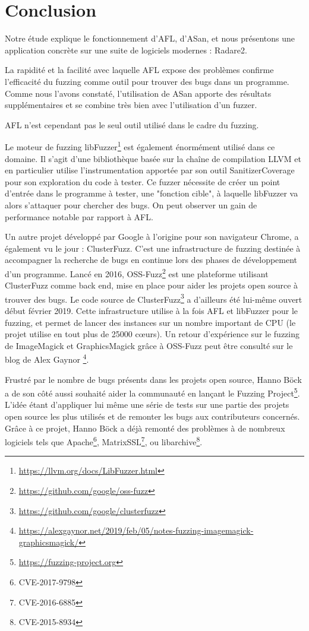 \chapter*{Conclusion}

Notre étude explique le fonctionnement d'AFL, d'ASan, et nous présentons une
application concrète sur une suite de logiciels modernes : Radare2.

La rapidité et la facilité avec laquelle AFL expose des problèmes confirme
l'efficacité du fuzzing comme outil pour trouver des bugs dans un programme.
Comme nous l'avons constaté, l'utilisation de ASan apporte des résultats
supplémentaires et se combine très bien avec l'utilisation d'un fuzzer.

AFL n'est cependant pas le seul outil utilisé dans le cadre du fuzzing.

Le moteur de fuzzing libFuzzer\footnote{\url{https://llvm.org/docs/LibFuzzer.html}}
est également énormément utilisé dans ce domaine.
Il s'agit d'une bibliothèque basée sur la chaîne de compilation LLVM et en
particulier utilise l'instrumentation apportée par son outil SanitizerCoverage
pour son exploration du code à tester.
Ce fuzzer nécessite de créer un point d'entrée dans le programme à tester, une
"fonction cible", à laquelle libFuzzer va alors s'attaquer pour chercher des bugs.
On peut observer un gain de performance notable par rapport à AFL.

Un autre projet développé par Google à l'origine pour son navigateur Chrome,
a également vu le jour : ClusterFuzz.
C'est une infrastructure de fuzzing destinée à accompagner la recherche de
bugs en continue lors des phases de développement d'un programme.
Lancé en 2016, OSS-Fuzz\footnote{\url{https://github.com/google/oss-fuzz}}
est une plateforme utilisant ClusterFuzz comme back end, mise en place pour
aider les projets open source à trouver des bugs. Le code source de
ClusterFuzz\footnote{\url{https://github.com/google/clusterfuzz}}
a d'ailleurs été lui-même ouvert début février 2019.
Cette infrastructure utilise à la fois AFL et libFuzzer pour le fuzzing,
et permet de lancer des instances sur un nombre important de CPU (le projet
utilise en tout plus de 25000 cœurs).
Un retour d'expérience sur le fuzzing de ImageMagick et GraphicsMagick grâce à OSS-Fuzz
peut être consulté sur le blog de Alex Gaynor
\footnote{\url{https://alexgaynor.net/2019/feb/05/notes-fuzzing-imagemagick-graphicsmagick/}}.

Frustré par le nombre de bugs présents dans les projets open source, Hanno
Böck a de son côté aussi souhaité aider la communauté en lançant
le Fuzzing Project\footnote{\url{https://fuzzing-project.org}}. L'idée étant
d'appliquer lui même une série de tests sur une partie des projets open
source les plus utilisés et de remonter les bugs aux contributeurs concernés.
Grâce à ce projet, Hanno Böck a déjà remonté des problèmes à de nombreux
logiciels tels que Apache\footnote{CVE-2017-9798}, MatrixSSL\footnote{CVE-2016-6885},
ou libarchive\footnote{CVE-2015-8934}.
